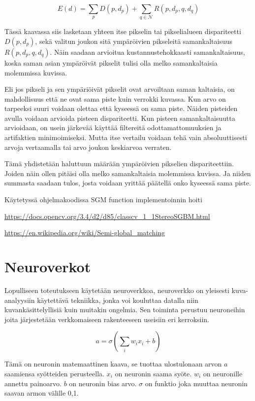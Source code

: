 \begin{equation}\label{yht:SGM}
    E(d) = \sum_{p} D(p, d_p) + \sum_{q \in \mathcal{N}} R(p, d_p, q, d_q)
\end{equation}

Tässä kaavassa siis lasketaan yhteen itse pikselin tai pikselialueen dispariteetti \(D(p, d_p)\), sekä valitun joukon sitä ympäröivien pikseleitä samankaltaisuus\(R(p, d_p, q, d_q)\). Näin saadaan arvioitua kustannustehokkaasti samankaltaisuus, koska saman asian ympäröivät pikselit tulisi olla melko samankaltaisia molemmissa kuvissa. 

Eli jos pikseli ja sen ympäriöivät pikselit ovat arvoiltaan saman kaltaisia, on mahdollisuus että ne ovat sama piste kuin verrokki kuvassa. Kun arvo on tarpeeksi suuri voidaan olettaa että kyseessä on sama piste. Näiden pisteiden avulla voidaan arvioida pisteen dispariteetti. Kun pisteen samankaltaisuutta arvioidaan, on usein järkevää käyttää filtereitä odottamattomuuksien ja artifaktien minimoimiseksi. Mutta itse vertailu voidaan tehä vain absoluuttisesti arvoja vertaamalla tai arvo joukon keskiarvoa verraten.

Tämä yhdistetään haluttuun määrään ympäröivien pikselien dispariteettiin. Joiden näin ollen pitäisi olla melko samankaltaisia molemmissa kuvissa. Ja niiden summasta saadaan tulos, josta voidaan yrittää päätellä onko kyseessä sama piste.

Käytetyssä ohjelmakoodissa SGM function implementoinnin hoiti 

\url{https://docs.opencv.org/3.4/d2/d85/classcv_1_1StereoSGBM.html}

\url{https://en.wikipedia.org/wiki/Semi-global_matching}

\section{Neuroverkot}

Lopulliseen toteutukseen käytetään neuroverkkoa, neuroverkko on yleisesti kuva-analyysiin käytettävä tekniikka, jonka voi kouluttaa datalla niin kuvankäsittelyllisiä kuin muitakin ongelmia. Sen toiminta perustuu neuroneihin joita järjestetään verkkomaiseen rakenteeseen useisiin eri kerroksiin.

\begin{equation}\label{yht:neuroni}
    a = \sigma\left(\sum_i w_i x_i + b\right)
\end{equation}

Tämä on neuronin matemaattinen kaava, se tuottaa ulostulonaan arvon \(a\)  saamiensa syötteiden perusteella. \(x_i\) on neuronin saama syöte. \(w_i\) on neuronille annettu painoarvo. \(b\) on neuronin bias arvo. \(\sigma\) on funktio joka muuttaa neuronin saavan armon välille 0,1.

